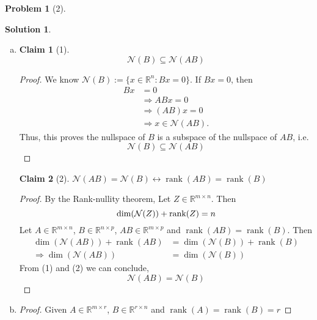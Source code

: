 \documentclass{amsart}[11pt]
\newtheorem*{claim}{Claim}
\theoremstyle{definition}
\newtheorem*{problem}{Problem}
\newtheorem*{solution}{Solution}
\newcommand{\R}{\mathbb{R}}
\newcommand{\row}{\textnormal{Row}}
\newcommand{\rank}{\textnormal{rank}}
\begin{document}
\begin{problem}[2]
\begin{solution}
\begin{enumerate}[(a)]
\begin{proof}
            \noindent $\therefore$ $\mathcal{N}(A)$ is orthogonal to $\row(A)$ 
        \end{proof}
        \vspace{\baselineskip}
        \item \begin{claim}[1]
            \[ \mathcal{N}(B) \subseteq \mathcal{N}(AB)\]
        \end{claim}
        \begin{proof}
            We know $\mathcal{N}(B):=\{x\in\R^n:Bx=0\}$. If $Bx=0$, then
            \begin{align*}
                Bx &= 0 \\
                &\Rightarrow ABx = 0 \\
                &\Rightarrow (AB)x = 0 \\
                &\Rightarrow x \in \mathcal{N}(AB).
            \end{align*}
            Thus, this proves the nullspace of $B$ is a subspace of the nullspace of $AB$, i.e.
            \[\mathcal{N}(B) \subseteq \mathcal{N}(AB)\tag{1}\]
        \end{proof}
        \begin{claim}[2]
            $\mathcal{N}(AB)=\mathcal{N}(B) \leftrightarrow \operatorname{rank}(AB)=\operatorname{rank}(B)$ 
        \end{claim}
        \begin{proof}
            By the Rank-nullity theorem, Let $Z\in\R^{m\times n}$.  Then
            \[ \dim(\mathcal{N}(Z))+\rank(Z) = n \]
            Let $A\in \R^{m \times n}$, $B\in\R^{n \times p}$, $AB\in\R^{m\times p}$ and $\operatorname{rank}(AB)=\operatorname{rank}(B)$. Then
            \begin{align*}
                \dim(\mathcal{N}(AB)) + \operatorname{rank}(AB) &= \dim(\mathcal{N}(B)) + \operatorname{rank}(B) \\
                \Rightarrow\dim(\mathcal{N}(AB))&=\dim(\mathcal{N}(B))
                \tag{2}
            \end{align*}
            From (1) and (2) we can conclude,
            \[\mathcal{N}(AB)=\mathcal{N}(B)\]
        \end{proof} 
        \vspace{\baselineskip}
        \item \begin{proof}
            Given $A\in\R^{m\times r}$, $B\in\R^{r\times n}$ and $\operatorname{rank}(A) = \operatorname{rank}(B)=r$


\end{proof}
\end{enumerate}
\end{solution}
\end{problem}
\end{document}
